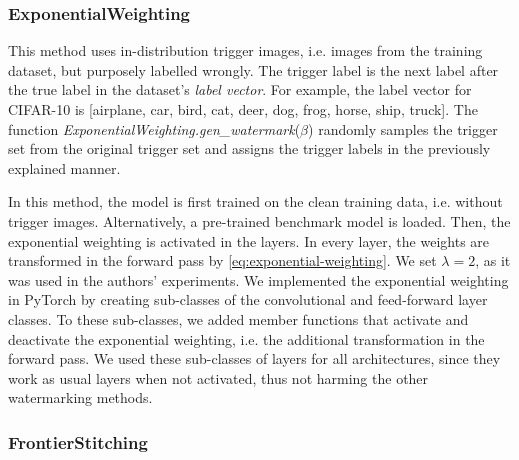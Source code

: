 \subsubsection{ExponentialWeighting}
\label{sec:exponential}

This method uses in-distribution trigger images, i.e. images from the training dataset, but purposely labelled wrongly. The trigger label is the next label after the true label in the dataset's \textit{label vector}. For example, the label vector for CIFAR-10 is [airplane, car, bird, cat, deer, dog, frog, horse, ship, truck]. The function \textit{ExponentialWeighting.gen\_watermark}($\beta$) randomly samples the trigger set from the original trigger set and assigns the trigger labels in the previously explained manner.

In this method, the model is first trained on the clean training data, i.e. without trigger images. Alternatively, a pre-trained benchmark model is loaded. Then, the exponential weighting is activated in the layers. In every layer, the weights are transformed in the forward pass by \cref{eq:exponential-weighting}. We set $\lambda=2$, as it was used in the authors' experiments. We implemented the exponential weighting in PyTorch by creating sub-classes of the convolutional and feed-forward layer classes. To these sub-classes, we added member functions that activate and deactivate the exponential weighting, i.e. the additional transformation in the forward pass. We used these sub-classes of layers for all architectures, since they work as usual layers when not activated, thus not harming the other watermarking methods.


\subsubsection{FrontierStitching}
\label{sec:frontier}

